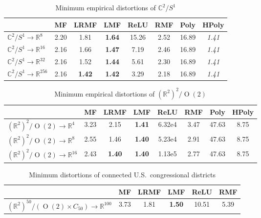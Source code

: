 \documentclass{article}
\theoremstyle{plain}
\theoremstyle{definition}
\begin{document}
{\begin{table}[p]
\caption{Minimum empirical distortions of $\mathbb{C}^2 / S^1$}
\label{table:C2_scaling}
\vspace{-6pt}
\centering
\begin{tabular}{|l||c|c|c|c||c|c|c|}
\hline
\textbf{} & \textbf{MF} & \textbf{LRMF} & \textbf{LMF} & \textbf{ReLU} & \textbf{RMF} & \textbf{Poly} & \textbf{HPoly} \\
\hline
\textbf{$\mathbb{C}^2/S^1 \to \mathbb{R}^8$} 
  & 2.20 & 1.81 & \textbf{1.64} & 15.26 & 2.52 & 16.89 & \textit{1.41} \\
\hline
\textbf{$\mathbb{C}^2/S^1 \to \mathbb{R}^{16}$} 
  & 2.16  & 1.66 & \textbf{1.47} & 7.19 & 2.46 & 16.89 & \textit{1.41} \\
\hline
\textbf{$\mathbb{C}^2/S^1 \to \mathbb{R}^{32}$} 
  & 2.16  & 1.52 & \textbf{1.44} & 5.61 & 2.30 & 16.89 & \textit{1.41} \\
\hline
\textbf{$\mathbb{C}^2/S^1 \to \mathbb{R}^{256}$} 
  & 2.16  & \textbf{1.42} & \textbf{1.42} & 3.29 & 2.18 & 16.89 & \textit{1.41} \\
\hline
\end{tabular}
\end{table}

\begin{table}[p]
\caption{Minimum empirical distortions of  $(\mathbb{R}^{2})^2 / \operatorname{O}(2)$}
\label{table:O2_scaling}
\vspace{-6pt}
\centering
\begin{tabular}{|l||c|c|c|c||c|c|c|}
\hline
\textbf{} & \textbf{MF} & \textbf{LRMF} & \textbf{LMF} & \textbf{ReLU} & \textbf{RMF} & \textbf{Poly} & \textbf{HPoly} \\
\hline
\textbf{$(\mathbb{R}^{2})^2 / \operatorname{O}(2) \to \mathbb{R}^4$} 
  & 3.23  & 2.15 & \textbf{1.41} & 6.32e{4} & 3.47 & 47.63 & 8.75 \\
\hline
\textbf{$(\mathbb{R}^{2})^2 / \operatorname{O}(2) \to \mathbb{R}^8$} 
  & 2.55  & 1.46 & \textbf{1.40} & 5.23e{4} & 2.91 & 47.63 & 8.75 \\
\hline
\textbf{$(\mathbb{R}^{2})^2 / \operatorname{O}(2) \to \mathbb{R}^{16}$} 
  & 2.43 & \textbf{1.40} & \textbf{1.40} & 1.13e{5} & 2.77 & 47.63 & 8.75 \\
\hline
\end{tabular}
\end{table}

\begin{table}[p]
\caption{Minimum distortions of connected U.S.\ congressional districts}
    \label{table:district_dist}
    \vspace{-6pt}
    \centering
    \begin{tabular}{|l||c|c|c|c||c|}
        \hline
        & \textbf{MF} & \textbf{LRMF} & \textbf{LMF} & \textbf{ReLU} & \textbf{RMF} \\
        \hline
        \textbf{$(\mathbb{R}^{2})^{50}/(\operatorname{O}(2) \times C_{50}) \to \mathbb{R}^{100}$} 
        & 3.73 & 1.81 & \textbf{1.50} & 10.51 & 5.39 \\
        \hline
    \end{tabular}
\end{table}

}
\end{document}
